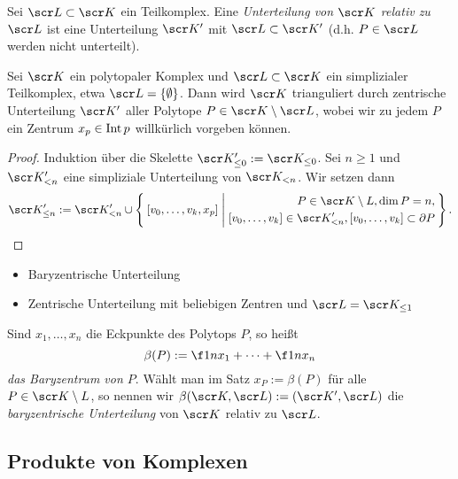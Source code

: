 \begin{df}
	Sei $\scr L \subset \scr K$ ein Teilkomplex.
	Eine \emph{Unterteilung von $\scr K$ relativ zu $\scr L$} ist eine Unterteilung $\scr K'$ mit $\scr L \subset \scr K'$ (d.h. $P \in \scr L$ werden nicht unterteilt).
\end{df}

\begin{st}
	Sei $\scr K$ ein polytopaler Komplex und $\scr L \subset \scr K$ ein simplizialer Teilkomplex, etwa $\scr L = \{\emptyset\}$.
	Dann wird $\scr K$ trianguliert durch zentrische Unterteilung $\scr K'$ aller Polytope $P \in \scr K \setminus \scr L$, wobei wir zu jedem $P$ ein Zentrum $x_p \in \operatorname{Int} p$ willkürlich vorgeben können.
	\begin{proof}
		Induktion über die Skelette $\scr K_{\le 0}' := \scr K_{\le 0}$.
		Sei $n \ge 1$ und $\scr K'_{<n}$ eine simpliziale Unterteilung von $\scr K_{<n}$.
		Wir setzen dann
		\[
			\scr K_{\le n}'
			:= \scr K_{<n}' \cup
			\Set{ [v_0,\dotsc, v_k, x_p] |
				\begin{aligned}
					P \in \scr K \setminus L, \dim P = n, \\
					[v_0, \dotsc, v_k] \in \scr K'_{<n},
					[v_0, \dotsc, v_k] \subset \boundary P
				\end{aligned}}.
		\]
	\end{proof}
\end{st}

\begin{ex}
	\begin{itemize}
		\item
			Baryzentrische Unterteilung
		\item
			Zentrische Unterteilung mit beliebigen Zentren und $\scr L = \scr K_{\le 1}$
	\end{itemize}
\end{ex}

\begin{df}
	Sind $x_1, \dotsc, x_n$ die Eckpunkte des Polytops $P$, so heißt
	\[
		\beta(P) := \f 1n x_1 + \dotsb + \f 1n x_n
	\]
	\emph{das Baryzentrum von $P$}.
	Wählt man im Satz %
	$x_P := \beta(P)$ für alle $P \in \scr K \setminus L$, so nennen wir $\beta(\scr K, \scr L) := (\scr K', \scr L)$ die \emph{baryzentrische Unterteilung} von $\scr K$ relativ zu $\scr L$.
\end{df}

\subsection{Produkte von Komplexen}

